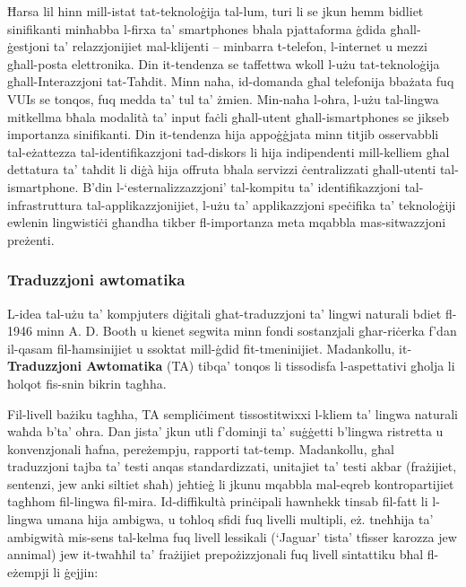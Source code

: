 \documentclass[]{../../metanetpaper}
\begin{document}
\begin{multicols}{2}
Ħarsa lil hinn mill-istat tat-teknoloġija tal-lum, turi li se jkun hemm bidliet sinifikanti minħabba l-firxa ta’ smartphones bħala pjattaforma ġdida għall-ġestjoni ta’ relazzjonijiet mal-klijenti – minbarra t-telefon, l-internet u mezzi għall-posta elettronika. Din it-tendenza se taffettwa wkoll l-użu tat-teknoloġija għall-Interazzjoni tat-Taħdit. Minn naħa, id-domanda għal telefonija bbażata fuq VUIs se tonqos, fuq medda ta' tul ta’ żmien. Min-naħa l-oħra, l-użu tal-lingwa mitkellma bħala modalità ta’ input faċli għall-utent għall-ismartphones se jikseb importanza sinifikanti. Din it-tendenza hija appoġġjata minn titjib osservabbli tal-eżattezza tal-identifikazzjoni tad-diskors li hija indipendenti mill-kelliem għal dettatura ta’ taħdit li diġà hija offruta bħala servizzi ċentralizzati għall-utenti tal-ismartphone. B’din l-‘esternalizzazzjoni’ tal-kompitu ta’ identifikazzjoni tal-infrastruttura tal-applikazzjonijiet, l-użu ta’ applikazzjoni speċifika ta’ teknoloġiji ewlenin lingwistiċi għandha tikber fl-importanza meta mqabbla mas-sitwazzjoni preżenti.


\subsubsection{Traduzzjoni awtomatika}

L-idea tal-użu ta’ kompjuters diġitali għat-traduzzjoni ta’ lingwi naturali bdiet fl-1946 minn A. D. Booth u kienet segwita minn fondi sostanzjali għar-riċerka f'dan il-qasam fil-ħamsinijiet u ssoktat mill-ġdid fit-tmeninijiet. Madankollu, it-\textbf{Traduzzjoni Awtomatika} (TA) tibqa’ tonqos li tissodisfa l-aspettativi għolja li ħolqot fis-snin bikrin tagħha.


Fil-livell bażiku tagħha, TA sempliċiment tissostitwixxi l-kliem ta' lingwa naturali waħda b'ta' oħra. Dan jista’ jkun utli f'dominji ta' suġġetti b’lingwa ristretta u konvenzjonali ħafna, pereżempju, rapporti tat-temp. Madankollu, għal traduzzjoni tajba ta’ testi anqas standardizzati, unitajiet ta’ testi akbar (frażijiet, sentenzi, jew anki siltiet sħaħ) jeħtieġ li jkunu mqabbla mal-eqreb kontropartijiet tagħhom fil-lingwa fil-mira. Id-diffikultà prinċipali hawnhekk tinsab fil-fatt li l-lingwa umana hija ambigwa, u toħloq  sfidi fuq livelli multipli, eż. tneħħija ta’ ambigwità mis-sens tal-kelma fuq livell lessikali (`Jaguar' tista’ tfisser karozza jew annimal) jew it-twaħħil ta’ frażijiet prepożizzjonali fuq livell sintattiku bħal fl-eżempji li ġejjin:


\end{multicols}
\end{document}
